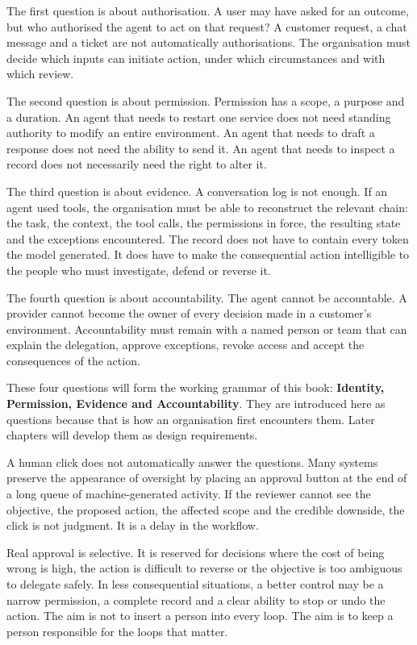 The first question is about authorisation. A user may have asked for an
outcome, but who authorised the agent to act on that request? A customer
request, a chat message and a ticket are not automatically
authorisations. The organisation must decide which inputs can initiate
action, under which circumstances and with which review.

The second question is about permission. Permission has a scope, a
purpose and a duration. An agent that needs to restart one service does
not need standing authority to modify an entire environment. An agent
that needs to draft a response does not need the ability to send it. An
agent that needs to inspect a record does not necessarily need the right
to alter it.

The third question is about evidence. A conversation log is not enough.
If an agent used tools, the organisation must be able to reconstruct the
relevant chain: the task, the context, the tool calls, the permissions
in force, the resulting state and the exceptions encountered. The record
does not have to contain every token the model generated. It does have
to make the consequential action intelligible to the people who must
investigate, defend or reverse it.

The fourth question is about accountability. The agent cannot be
accountable. A provider cannot become the owner of every decision made
in a customer's environment. Accountability must remain with a named
person or team that can explain the delegation, approve exceptions,
revoke access and accept the consequences of the action.

These four questions will form the working grammar of this book:
\textbf{Identity, Permission, Evidence and Accountability}. They are
introduced here as questions because that is how an organisation first
encounters them. Later chapters will develop them as design
requirements.

A human click does not automatically answer the questions. Many systems
preserve the appearance of oversight by placing an approval button at
the end of a long queue of machine-generated activity. If the reviewer
cannot see the objective, the proposed action, the affected scope and
the credible downside, the click is not judgment. It is a delay in the
workflow.

Real approval is selective. It is reserved for decisions where the cost
of being wrong is high, the action is difficult to reverse or the
objective is too ambiguous to delegate safely. In less consequential
situations, a better control may be a narrow permission, a complete
record and a clear ability to stop or undo the action. The aim is not to
insert a person into every loop. The aim is to keep a person responsible
for the loops that matter.

